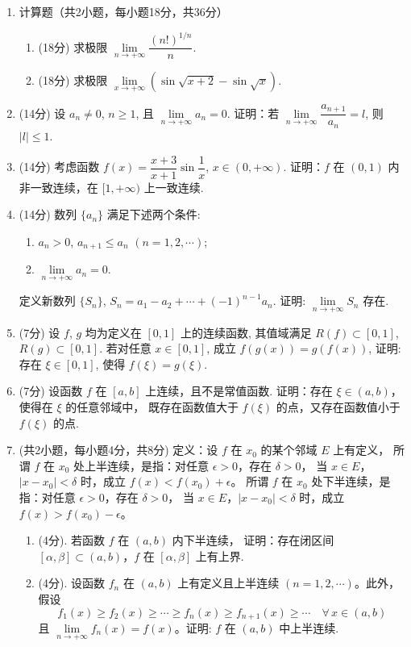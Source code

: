 \begin{enumerate}
\item 计算题（共2小题，每小题18分，共36分）
\begin{enumerate}
    \item[(i)] (18分) 求极限 $\lim\limits_{n \to +\infty} \dfrac{(n!)^{1/n}}{n}$.
    \item[(ii)] (18分) 求极限 $\lim\limits_{x \to +\infty} (\sin\sqrt{x+2} - \sin\sqrt{x})$.
\end{enumerate}

\item (14分) 设 $a_n \neq 0$, $n \geq 1$, 且 $\lim\limits_{n \to +\infty} a_n = 0$. 
证明：若 $\lim\limits_{n \to +\infty} \dfrac{a_{n+1}}{a_n} = l$, 则 $|l| \leq 1$.

\item (14分) 考虑函数 $f(x) = \dfrac{x+3}{x+1} \sin\dfrac{1}{x}$, $x \in (0, +\infty)$. 
证明：$f$ 在 $(0,1)$ 内非一致连续，在 $[1,+\infty)$ 上一致连续.

\item (14分) 数列 $\{a_n\}$ 满足下述两个条件:
\begin{enumerate}
    \item[(1)] $a_n > 0$, $a_{n+1} \leq a_n$ $(n=1,2,\cdots)$;
    \item[(2)] $\lim\limits_{n \to +\infty} a_n = 0$.
\end{enumerate}
定义新数列 $\{S_n\}$, $S_n = a_1 - a_2 + \cdots + (-1)^{n-1} a_n$. 
证明: $\lim\limits_{n \to +\infty} S_n$ 存在.

\item (7分) 设 $f$, $g$ 均为定义在 $[0,1]$ 上的连续函数, 
其值域满足 $R(f) \subset [0,1]$, $R(g) \subset [0,1]$. 
若对任意 $x \in [0,1]$, 成立 $f(g(x)) = g(f(x))$, 
证明: 存在 $\xi \in [0,1]$, 使得 $f(\xi) = g(\xi)$.

\item (7分) 设函数 $f$ 在 $[a,b]$ 上连续，且不是常值函数. 
证明：存在 $\xi \in (a,b)$，使得在 $\xi$ 的任意邻域中，
既存在函数值大于 $f(\xi)$ 的点，又存在函数值小于 $f(\xi)$ 的点.

\item (共2小题，每小题4分，共8分)
定义：设 $f$ 在 $x_0$ 的某个邻域 $E$ 上有定义，
所谓 $f$ 在 $x_0$ 处上半连续，是指：对任意 $\epsilon > 0$，存在 $\delta > 0$，
当 $x \in E$，$|x - x_0| < \delta$ 时，成立 $f(x) < f(x_0) + \epsilon$。
所谓 $f$ 在 $x_0$ 处下半连续，是指：对任意 $\epsilon > 0$，存在 $\delta > 0$，
当 $x \in E$，$|x - x_0| < \delta$ 时，成立 $f(x) > f(x_0) - \epsilon$。
\begin{enumerate}
    \item[(i)] (4分). 若函数 $f$ 在 $(a,b)$ 内下半连续，
    证明：存在闭区间 $[\alpha, \beta] \subset (a,b)$，$f$ 在 $[\alpha, \beta]$ 上有上界.
    \item[(ii)] (4分). 设函数 $f_n$ 在 $(a,b)$ 上有定义且上半连续 $(n=1,2,\cdots)$。此外，假设
    \[
    f_1(x) \geq f_2(x) \geq \cdots \geq f_n(x) \geq f_{n+1}(x) \geq \cdots \quad \forall\, x \in (a,b)
    \]
    且 $\lim\limits_{n \to +\infty} f_n(x) = f(x)$。证明: $f$ 在 $(a,b)$ 中上半连续.
\end{enumerate}
\end{enumerate}


